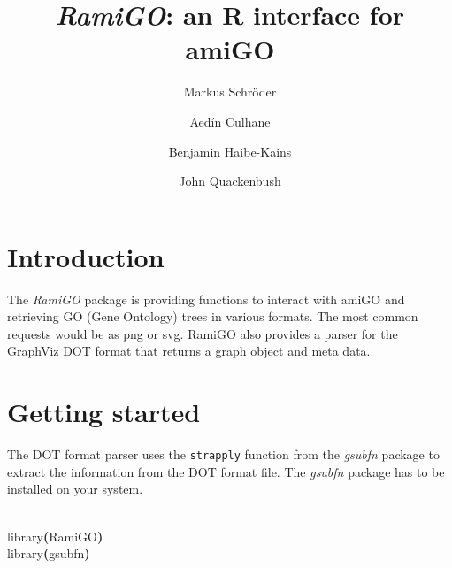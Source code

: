 \documentclass[a4paper,11pt]{article}
\newcommand{\hlfunctioncall}[1]{\textcolor[rgb]{1,0,0}{#1}}%
\newcommand{\hlkeyword}[1]{\textcolor[rgb]{0,0,0}{\textbf{#1}}}%
\newcommand{\hlsymbol}[1]{\textcolor[rgb]{0,0,0}{#1}}%
\newcommand{\hlprompt}[1]{\textcolor[rgb]{0,0,0}{#1}}%
\newcommand{\hlstd}[1]{\textcolor[rgb]{0,0,0}{#1}}%
\newenvironment{Houtput}{\raggedright}{%
%
}
\newcommand{\Rfunction}[1]{{\texttt{#1}}}
\newcommand{\Rpackage}[1]{\textit{#1}}
\begin{document}
\title{\Rpackage{RamiGO}: an R interface for amiGO}
\author[1,2]{Markus Schr\"{o}der}
\author[1]{Aed\'{i}n Culhane}
\author[1]{Benjamin Haibe-Kains}
\author[1]{John Quackenbush}





\maketitle
\tableofcontents

\section{Introduction}

The \Rpackage{RamiGO} package is providing functions to interact with amiGO and retrieving GO (Gene Ontology) trees in various formats. The most common requests would be as png or svg. RamiGO also provides a parser for the GraphViz DOT format that returns a graph object and meta data.

\section{Getting started}
The DOT format parser uses the \Rfunction{strapply} function from the \Rpackage{gsubfn} package to extract the information from the DOT format file. The \Rpackage{gsubfn} package has to be installed on your system.

\begin{Houtput}
\hspace*{\fill}\\
\hlstd{}\ttfamily\noindent
\hlprompt{\usebox{\hlnormalsizeboxgreaterthan}{\ }}\hlfunctioncall{library}\hlkeyword{(}\hlsymbol{RamiGO}\hlkeyword{)}\mbox{}
\normalfont
\hspace*{\fill}\\
\hlstd{}\ttfamily\noindent
\hlprompt{\usebox{\hlnormalsizeboxgreaterthan}{\ }}\hlfunctioncall{library}\hlkeyword{(}\hlsymbol{gsubfn}\hlkeyword{)}\mbox{}
\normalfont
\hspace*{\fill}\\
\hlstd{}
\end{Houtput}
\end{document}
